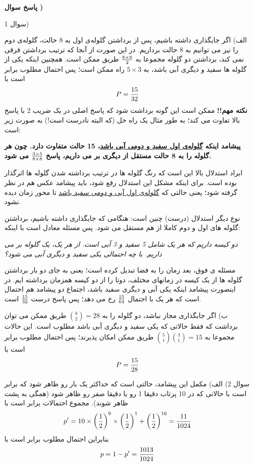 \documentclass[10pt,letterpaper]{report}
\newcounter{questionanswernumber}
\newcommand{\QA}{
\textbf{پاسخ سوال \thequestionanswernumber)}
\stepcounter{questionanswernumber}
}
\begin{document}
\QA

سوال 1) 

الف) اگر جایگذاری داشته باشیم، پس از برداشتن گلوله‌ی اول به 8 حالت، گلوله‌ی دوم را نیز می توانیم به 8 حالت برداریم. در این صورت از آنجا که ترتیب برداشتن فرقی نمی کند، برداشتن دو گلوله مجموعا به 
$
8\times 8\over 2
$
طریق ممکن است. همچنین اینکه یکی از گلوله ها سفید و دیگری آبی باشد، به 
$
5\times 3
$
راه ممکن است؛ پس احتمال مطلوب برابر است با
$$
P={15\over 32}
$$
\textbf{نکته مهم!!}
ممکن است این گونه برداشت شود که پاسخ اصلی در یک ضریب 2 با پاسخ بالا تفاوت می کند؛ به طور مثال یک راه حل (که البته نادرست است!) به صورت زیر است:

\textbf{
پیشامد اینکه \underline{گلوله‌ی اول سفید و دومی آبی باشد}، 15 حالت متفاوت دارد. چون هر گلوله را به 8 حالت مستقل از دیگری بر می داریم، پاسخ 
$
3\times 5\over 8\times 8
$
می شود.
}

ایراد استدلال بالا این است که رنگ گلوله ها در ترتیب برداشته شدن گلوله ها اثرگذار بوده است. برای اینکه مشکل این استدلال رفع شود، باید پیشامد عکس هم در نظر گرفته شود؛ یعنی حالتی که \underline{گلوله‌ی اول آبی و دومی سفید باشد} تا محور زمان دیده نشود.

نوع دیگر استدلال (درست) چنین است: هنگامی که جایگذاری داشته باشیم، برداشتن گلوله های اول و دوم کاملا از هم مستقل می شود. پس مسئله معادل است با اینکه:

\textit{
دو کیسه داریم که هر یک شامل 5 سفید و 3 آبی است. از هر یک، یک گلوله بر می داریم. با چه احتمالی یکی سفید و دیگری آبی می شود؟
}

مسئله ی فوق، بعد زمان را به فضا تبدیل کرده است؛ یعنی به جای دو بار برداشتن گلوله ها از یک کیسه در زمانهای مختلف، دوتا را از دو کیسه همزمان برداشته ایم. در اینصورت پیشامد اینکه یکی آبی و دیگری سفید باشد، اجتماع دو پیشامد هم احتمال است که هر یک با احتمال
$
15\over 64
$
رخ می دهد؛ پس پاسخ درست 
$
15\over 32
$
است.

ب) اگر جایگذاری مجاز نباشد، دو گلوله را به 
$
\binom{8}{2}=28
$
طریق ممکن می توان برداشت که فقط حالاتی که یکی سفید و دیگری آبی باشد مطلوب است. این حالات مجموعا به 
$
\binom{5}{1}\binom{3}{1}=15
$
طریق ممکن امکان پذیرند؛ پس احتمال مطلوب برابر است با
$$
P={15\over 28}
$$

سوال 2) الف) مکمل این پیشامد، حالتی است که حداکثر یک بار رو ظاهر شود که برابر است با حالاتی که در 10 پرتاب دقیقا 1 رو یا دقیقا صفر رو ظاهر شود (همگی به پشت ظاهر شوند). مجموع احتمالات برابر است با
$$
p'=10\times \left({1\over 2}\right)^9\times \left({1\over 2}\right)^1 +\left({1\over 2}\right)^{10}={11\over 1024}
$$
بنابراین احتمال مطلوب برابر است با
$$
p=1-p'={1013\over 1024}
$$
\end{document}

